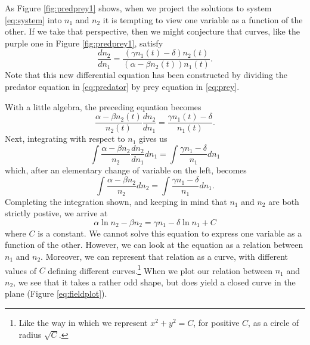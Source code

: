 \documentclass[../book.tex]{subfiles}
\begin{document}
As Figure \ref{fig:predprey1} shows, when we project the solutions to system \eqref{eq:system} into \(n_1\) and \(n_2\) it is tempting to view one variable as a function of the other. If we take that perspective, then we might conjecture that curves, like the purple one in Figure \ref{fig:predprey1}, satisfy
\begin{equation}\label{eq:sys-2}
\frac{dn_2}{dn_1}
=
\frac{(\gamma n_1(t) - \delta )n_2(t)}{(\alpha - \beta n_2(t) ) n_1(t)}.
\end{equation}
Note that this new differential equation has been constructed by dividing the predator equation in \eqref{eq:predator} by prey equation in \eqref{eq:prey}.

With a little algebra, the preceding equation becomes
\begin{equation}\label{eq:sys-3}
\frac{\alpha - \beta n_2(t) }{n_2(t)}  \frac{dn_2}{dn_1}
=
\frac{\gamma n_1(t) - \delta }{n_1(t)}.
\end{equation}
Next, integrating with respect to \(n_1\) gives us
\begin{equation}\label{eq:sys-4}
\int
\frac{\alpha - \beta n_2}{n_2}  \frac{dn_2}{dn_1} dn_1
=
\int
\frac{\gamma n_1 - \delta }{n_1} dn_1
\end{equation}
which, after an elementary change of variable on the left, becomes
\begin{equation}\label{eq:sys-5}
\int
\frac{\alpha - \beta n_2}{n_2} dn_2
=
\int
\frac{\gamma n_1 - \delta }{n_1} dn_1.
\end{equation}
Completing the integration shown, and keeping in mind that \(n_1\) and \(n_2\) are both strictly postive, we arrive at
\begin{equation}\label{eq:relation}
  \alpha \ln n_2 - \beta n_2 = \gamma  n_1 - \delta  \ln n_1 +C
\end{equation}
where \(C\) is a constant. We cannot solve this equation to express one variable as a function of the other. However, we can look at the equation as a relation between \(n_1\) and \(n_2\). Moreover, we can represent that relation as a curve, with different values of \(C\) defining different curves.\footnote{Like the way in which we represent \(x^2 + y^2 = C\), for positive \(C\), as a circle of radius \(\sqrt{C}\).} When we plot our relation between \(n_1\) and \(n_2\), we see that it takes a rather odd shape, but does yield a closed curve in the plane (Figure \ref{eq:fieldplot}).
\end{document}
